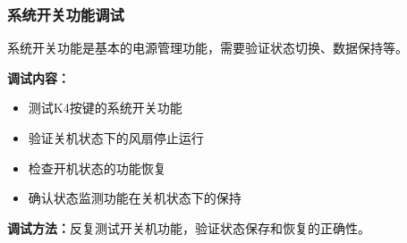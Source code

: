 \subsubsection{系统开关功能调试}

\qquad 系统开关功能是基本的电源管理功能，需要验证状态切换、数据保持等。

\textbf{调试内容：}
\begin{itemize}
    \vspace{-6pt}
  \item 测试K4按键的系统开关功能
    \vspace{-6pt}
  \item 验证关机状态下的风扇停止运行
    \vspace{-6pt}
  \item 检查开机状态的功能恢复
    \vspace{-6pt}
  \item 确认状态监测功能在关机状态下的保持
\end{itemize}

\textbf{调试方法：}反复测试开关机功能，验证状态保存和恢复的正确性。
